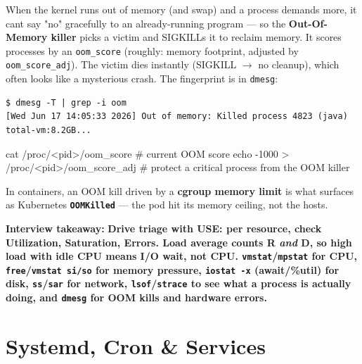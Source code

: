 \documentclass[11pt]{article}
\newenvironment{Shaded}{\begin{snugshade}}{\end{snugshade}}
\newcommand{\AttributeTok}[1]{\textcolor[rgb]{0.16,0.50,0.73}{#1}}
\newcommand{\BuiltInTok}[1]{\textcolor[rgb]{0.50,0.55,0.55}{#1}}
\newcommand{\CommentTok}[1]{\textcolor[rgb]{0.48,0.49,0.49}{#1}}
\newcommand{\FunctionTok}[1]{\textcolor[rgb]{0.56,0.27,0.68}{#1}}
\newcommand{\NormalTok}[1]{\textcolor[rgb]{0.81,0.81,0.76}{#1}}
\newcommand{\OperatorTok}[1]{\textcolor[rgb]{0.81,0.81,0.76}{#1}}
\begin{document}
When the kernel runs out of memory (and swap) and a process demands more, it can\textquotesingle t say "no" gracefully to an already-running program --- so the \textbf{Out-Of-Memory killer} picks a victim and SIGKILLs it to reclaim memory. It scores processes by an \texttt{oom\_score} (roughly: memory footprint, adjusted by \texttt{oom\_score\_adj}). The victim dies instantly (SIGKILL \(\rightarrow\) no cleanup), which often looks like a mysterious crash. The fingerprint is in \texttt{dmesg}:

\setcodelang{}

\begin{verbatim}
$ dmesg -T | grep -i oom
[Wed Jun 17 14:05:33 2026] Out of memory: Killed process 4823 (java) total-vm:8.2GB...
\end{verbatim}


\begin{Shaded}
\begin{Highlighting}[]
\FunctionTok{cat}\NormalTok{ /proc/}\OperatorTok{\textless{}}\NormalTok{pid}\OperatorTok{\textgreater{}}\NormalTok{/oom\_score         }\CommentTok{\# current OOM score}
\BuiltInTok{echo} \AttributeTok{{-}1000} \OperatorTok{\textgreater{}}\NormalTok{ /proc/}\OperatorTok{\textless{}}\NormalTok{pid}\OperatorTok{\textgreater{}}\NormalTok{/oom\_score\_adj   }\CommentTok{\# protect a critical process from the OOM killer}
\end{Highlighting}
\end{Shaded}

In containers, an OOM kill driven by a \textbf{cgroup memory limit} is what surfaces as Kubernetes \textbf{\texttt{OOMKilled}} --- the pod hit its memory ceiling, not the host\textquotesingle s.

\textbf{Interview takeaway:} \textbf{Drive triage with USE: per resource, check Utilization, Saturation, Errors. Load average counts R \emph{and} D, so high load with idle CPU means I/O wait, not CPU. \texttt{vmstat}/\texttt{mpstat} for CPU, \texttt{free}/\texttt{vmstat\ si/so} for memory pressure, \texttt{iostat\ -x} (await/\%util) for disk, \texttt{ss}/\texttt{sar} for network, \texttt{lsof}/\texttt{strace} to see what a process is actually doing, and \texttt{dmesg} for OOM kills and hardware errors.}

\section{Systemd, Cron \& Services}\label{systemd-cron--services}
\end{document}
